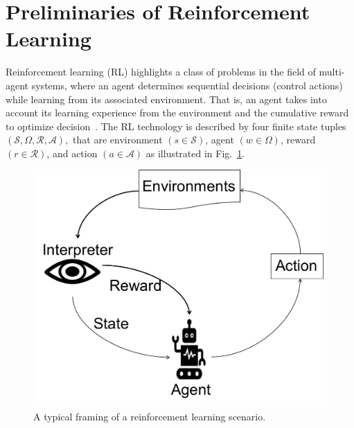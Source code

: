 \documentclass[conference]{IEEEtran}
\begin{document}




\section{Preliminaries of Reinforcement Learning}
\label{sec:reinf-learn}

Reinforcement learning (RL) highlights a class of problems in the  field of multi-agent systems, where an agent determines sequential decisions (control actions) while learning from its associated environment. That is, an agent takes into account its learning  experience from the environment  and the cumulative reward to optimize decision~\cite{Francois-Lavet:2018}. The RL technology is described by four finite state tuples~$(\mathcal{S},\Omega,\mathcal{R},\mathcal{A}),$ that are  environment $(s \in \mathcal{S})$, agent $(w \in \Omega)$, reward $(r \in \mathcal{R})$, and action $(a \in \mathcal{A})$ as illustrated in Fig.~\ref{fig:fig-rl}. %
%
\begin{figure}
  \centering
  \includegraphics[scale=0.25]{figs/img/Ref-L-agent}
  \caption{A typical framing of a reinforcement learning scenario.}
  \label{fig:fig-rl}
\end{figure}
\end{document}
